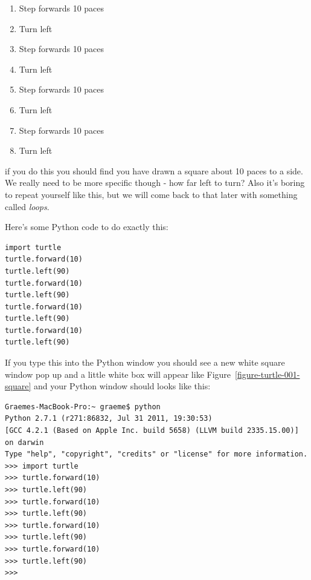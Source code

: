 \documentclass[a4paper, 11pt]{book}
\begin{document}
\begin{enumerate}
\item{Step forwards 10 paces}
\item{Turn left}
\item{Step forwards 10 paces}
\item{Turn left}
\item{Step forwards 10 paces}
\item{Turn left}
\item{Step forwards 10 paces}
\item{Turn left}
\end{enumerate}

\noindent
if you do this you should find you have drawn a square about 10 paces to a side. We really need to be more specific though - how far left to turn? Also it's boring to repeat yourself like this, but we will come back to that later with something called \emph{loops}. 

Here's some Python code to do exactly this:

{\small
\begin{verbatim}
import turtle
turtle.forward(10)
turtle.left(90)
turtle.forward(10)
turtle.left(90)
turtle.forward(10)
turtle.left(90)
turtle.forward(10)
turtle.left(90)
\end{verbatim}
}

\noindent
If you type this into the Python window you should see a new white
square window pop up and a little white box will appear like
Figure~\ref{figure-turtle-001-square} and your Python window should looks like this:

{\small
\begin{verbatim}
Graemes-MacBook-Pro:~ graeme$ python
Python 2.7.1 (r271:86832, Jul 31 2011, 19:30:53) 
[GCC 4.2.1 (Based on Apple Inc. build 5658) (LLVM build 2335.15.00)] on darwin
Type "help", "copyright", "credits" or "license" for more information.
>>> import turtle
>>> turtle.forward(10)
>>> turtle.left(90)
>>> turtle.forward(10)
>>> turtle.left(90)
>>> turtle.forward(10)
>>> turtle.left(90)
>>> turtle.forward(10)
>>> turtle.left(90)
>>> 
\end{verbatim}
}
\end{document}
